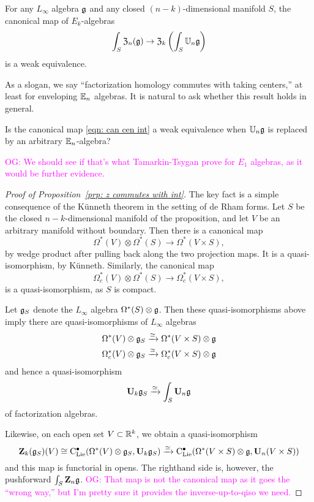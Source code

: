 \documentclass[11pt]{amsart}
\numberwithin{equation}{section}
\def\owen{\textcolor{magenta}{OG: }\textcolor{magenta}}
\begin{document}
\begin{prp}
\label{prp: z commutes with int}
For any $L_\infty$ algebra $\mathfrak g$ and any closed $(n-k)$-dimensional manifold $S$,
the canonical map of $E_k$-algebras
\[
\int_{S} \mathfrak Z_n(\mathfrak g) \to \mathfrak Z_k \left( \int_S \mathbb U_n \mathfrak g \right)
\]
is a weak equivalence.
\end{prp}

As a slogan, we say ``factorization homology commutes with taking centers,'' 
at least for enveloping $\mathbb E_n$ algebras.
It is natural to ask whether this result holds in general.

\begin{qtn}
Is the canonical map \eqref{eqn: can cen int} a weak equivalence when $\mathbb U_n \mathfrak g$ is replaced by an arbitrary $\mathbb E_n$-algebra?
\end{qtn}

\owen{We should see if that's what Tamarkin-Tsygan prove for  $E_1$ algebras, as it would be further evidence.}

\begin{proof}[Proof of Proposition~\ref{prp: z commutes with int}]
The key fact is a simple consequence of the K\"unneth theorem in the setting of de Rham forms.
Let $S$ be the closed $n-k$-dimensional manifold of the proposition,
and let $V$ be an arbitrary manifold without boundary.
Then there is a canonical map
\[
\Omega^*(V) \otimes \Omega^*(S) \to \Omega^*(V \times S),
\]
by wedge product after pulling back along the two projection maps.
It is a quasi-isomorphism, by K\"unneth.
Similarly, the canonical map
\[
\Omega_c^*(V) \otimes \Omega^*(S) \to \Omega_c^*(V \times S),
\]
is a quasi-isomorphism, as $S$ is compact.

Let $\mathfrak g_S$ denote the $L_\infty$ algebra $\Omega^*(S) \otimes \mathfrak g$. 
Then these quasi-isomorphisms above imply there are quasi-isomorphisms of $L_\infty$ algebras
\begin{align*}
\Omega^*(V) \otimes \mathfrak g_S &\xrightarrow{\simeq} \Omega^*(V \times S) \otimes \mathfrak g \\
\Omega_c^*(V) \otimes \mathfrak g_S &\xrightarrow{\simeq} \Omega_c^*(V \times S) \otimes \mathfrak g 
\end{align*}
and hence a quasi-isomorphism
\[
\mathbf U_k \mathfrak g_S \xrightarrow{\simeq} \int_S \mathbf U_n \mathfrak g
\]
of factorization algebras.

Likewise, on each open set $V \subset \mathbb R^k$, 
we obtain a quasi-isomorphism
\[
\mathbf Z_k(\mathfrak g_S)(V) \cong {\rm C}_{\rm Lie}^\bullet( \Omega^*(V) \otimes \mathfrak g_S, \mathbf U_k \mathfrak g_S) \xrightarrow{\simeq} {\rm C}_{\rm Lie}^\bullet(\Omega^*(V \times S) \otimes \mathfrak g, \mathbf U_n(V \times S))
\]
and this map is functorial in opens.
The righthand side is, however, the pushforward $\int_S \mathbf Z_n \mathfrak g$.
\owen{That map is not the canonical map as it goes the ``wrong way,'' but I'm pretty sure it provides the inverse-up-to-qiso we need.}
\end{proof}
\end{document}
